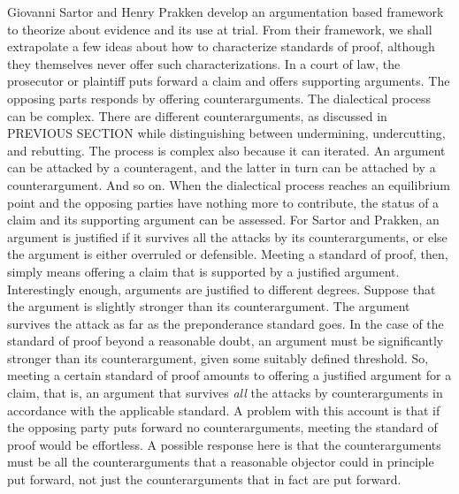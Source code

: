 \documentclass[10pt]{article}
\begin{document}
Giovanni Sartor and Henry Prakken develop an argumentation based framework to theorize about evidence and its use at trial. From their framework, we shall extrapolate a few ideas about how to characterize standards of proof, although they themselves never offer such characterizations. In a court of law, the prosecutor or plaintiff puts forward a claim and offers supporting arguments. The opposing parts responds by offering counterarguments. The dialectical process can be complex. There are different counterarguments, as discussed in PREVIOUS SECTION while distinguishing between undermining,  undercutting, and rebutting. The process is complex also because it can iterated. 
An argument can be attacked by a counteragent, and the latter in turn can be attached by a counterargument. And so on. 
When the dialectical process reaches an equilibrium point and the opposing parties have nothing more to contribute, 
the status of a claim and its supporting argument can be assessed. For Sartor and Prakken, an argument is justified if it survives all the attacks by its counterarguments, or else the argument is either overruled or defensible. Meeting a standard of proof, then, simply means offering a claim that is supported by a justified argument. Interestingly enough, arguments are justified to different degrees. Suppose that the argument is slightly stronger than its counterargument. The argument survives the attack as far as the preponderance standard goes. In the case of the standard of proof beyond a reasonable doubt, an argument must be significantly stronger than its counterargument, given some suitably defined threshold. So, meeting a certain standard of proof  amounts to offering a justified argument for a claim, that is, an argument that survives \textit{all} the attacks by counterarguments in accordance with the applicable standard. A problem with this account is that if the opposing party puts forward no counterarguments, meeting the standard of proof would be effortless. A possible response here is that the counterarguments must be all the counterarguments that a reasonable objector could in principle put forward, not just the counterarguments that in fact are put forward. 
\end{document}
